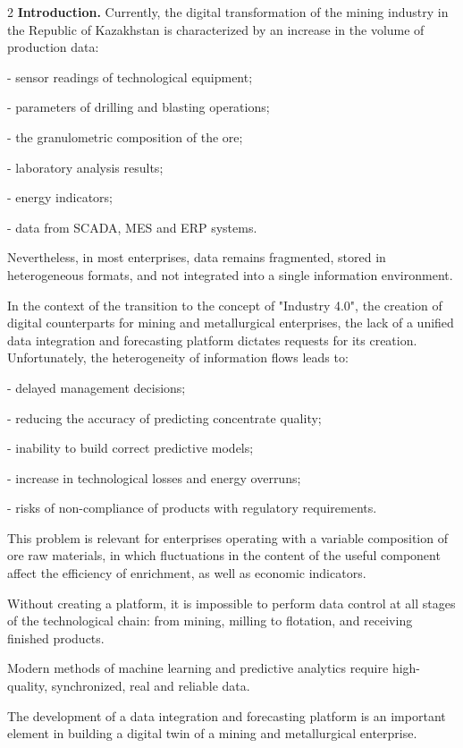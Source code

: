 \begin{multicols}{2}
{\bfseries Introduction.} Currently, the digital transforma\-tion of the mining
industry in the Republic of Kazakhstan is characterized by an increase
in the volume of production data:

- sensor readings of technological equipment;

- parameters of drilling and blasting operations;

- the granulometric composition of the ore;

- laboratory analysis results;

- energy indicators;

- data from SCADA, MES and ERP systems.

Nevertheless, in most enterprises, data remains fragmented, stored in
heterogeneous formats, and not integrated into a single information
environment.

In the context of the transition to the concept of "Industry 4.0", the
creation of digital counterparts for mining and metallurgical
enterprises, the lack of a unified data integration and forecasting
platform dictates requests for its creation. Unfortunately, the
heterogeneity of information flows leads to:

- delayed management decisions;

- reducing the accuracy of predicting concentrate quality;

- inability to build correct predictive models;

- increase in technological losses and energy overruns;

- risks of non-compliance of products with regulatory requirements.

This problem is relevant for enterprises operating with a variable
composition of ore raw materials, in which fluctuations in the content
of the useful component affect the efficiency of enrichment, as well as
economic indicators.

Without creating a platform, it is impossible to perform data control at
all stages of the technological chain: from mining, milling to
flotation, and receiving finished products.

Modern methods of machine learning and predictive analytics require
high-quality, synchronized, real and reliable data.

The development of a data integration and forecasting platform is an
important element in building a digital twin of a mining and
metallurgical enterprise.


\end{multicols}
